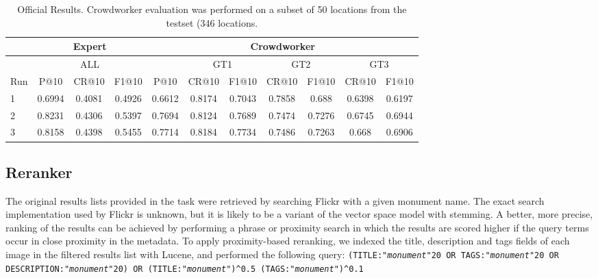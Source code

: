 \documentclass{../acm_proc_article-me11_tweaked}
\newcommand{\textapprox}{\raisebox{0.5ex}{\texttildelow}}
\begin{document}
\begin{table}[ht]
	\centering
	\small
	\caption{\label{tab:results}Official Results. Crowdworker evaluation was performed on a subset of 50 locations from the testset (346 locations.}
	\begin{tabular}{|l|||c|c|c|||c||c|c||c|c||c|c|}
		\hline
		 & \multicolumn{3}{c|||}{Expert} &  \multicolumn{7}{c|}{Crowdworker}\\
		\hline
		 & \multicolumn{3}{c|||}{ALL} &  & \multicolumn{2}{c||}{GT1} & \multicolumn{2}{c||}{GT2} & \multicolumn{2}{c|}{GT3}\\
		Run & P@10 & CR@10 & F1@10 & P@10 & CR@10 & F1@10 & CR@10 & F1@10 & CR@10 & F1@10 \\
		\hline\hline
		1 & 0.6994 & 0.4081 & 0.4926 & 0.6612 & 0.8174 & 0.7043 & 0.7858 & 0.688 & 0.6398 & 0.6197 \\
		\hline
		2 & 0.8231 & 0.4306 & 0.5397 & 0.7694 & 0.8124 & 0.7689 & 0.7474 & 0.7276 & 0.6745 & 0.6944 \\
		\hline
		3 & 0.8158 & 0.4398 & 0.5455 & 0.7714 & 0.8184 & 0.7734 & 0.7486 & 0.7263 & 0.668 & 0.6906 \\
		\hline
	\end{tabular}
\end{table}

\subsection{Reranker}
The original results lists provided in the task were retrieved by searching Flickr with a given monument name. The exact search implementation used by Flickr is unknown, but it is likely to be a variant of the vector space model with stemming. A better, more precise, ranking of the results can be achieved by performing a phrase or proximity search in which the results are scored higher if the query terms occur in close proximity in the metadata. To apply proximity-based reranking, we indexed the title, description and tags fields of each image in the filtered results list with Lucene, and performed the following query: \texttt{(TITLE:"\emph{monument}"\textapprox20 OR TAGS:"\emph{monument}"\textapprox20 OR DESCRIPTION:"\emph{monument}"\textapprox20) OR (TITLE:"\emph{monument}")\textasciicircum0.5 (TAGS:"\emph{monument}")\textasciicircum0.1}
\end{document}
